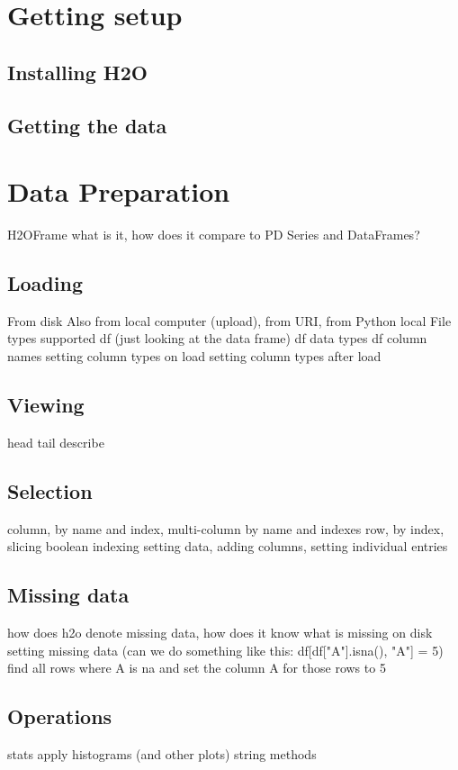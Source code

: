 \section{Getting setup}

\subsection{Installing H2O}


\subsection{Getting the data}

\section{Data Preparation}
H2OFrame what is it, how does it compare to PD Series and DataFrames?

\subsection{Loading}
From disk
Also from local computer (upload), from URI, from Python local
File types supported
df (just looking at the data frame)
df data types
df column names
setting column types on load
setting column types after load

\subsection{Viewing}
head
tail
describe

\subsection{Selection}
column, by name and index, multi-column by name and indexes
row, by index, slicing
boolean indexing
setting data, adding columns, setting individual entries

\subsection{Missing data}
how does h2o denote missing data, how does it know what is missing on disk
setting missing data (can we do something like this: df[df["A"].isna(), "A"] = 5)
find all rows where A is na and set the column A for those rows to 5

\subsection{Operations}
stats
apply
histograms (and other plots)
string methods

